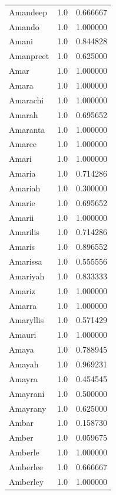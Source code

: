 \documentclass[
  letterpaper,
  DIV=11,
  numbers=noendperiod]{scrreprt}
\begin{document}
\begin{tabular}{lrr}
Amandeep        &   1.0 &   0.666667 \\
Amando          &   1.0 &   1.000000 \\
Amani           &   1.0 &   0.844828 \\
Amanpreet       &   1.0 &   0.625000 \\
Amar            &   1.0 &   1.000000 \\
Amara           &   1.0 &   1.000000 \\
Amarachi        &   1.0 &   1.000000 \\
Amarah          &   1.0 &   0.695652 \\
Amaranta        &   1.0 &   1.000000 \\
Amaree          &   1.0 &   1.000000 \\
Amari           &   1.0 &   1.000000 \\
Amaria          &   1.0 &   0.714286 \\
Amariah         &   1.0 &   0.300000 \\
Amarie          &   1.0 &   0.695652 \\
Amarii          &   1.0 &   1.000000 \\
Amarilis        &   1.0 &   0.714286 \\
Amaris          &   1.0 &   0.896552 \\
Amarissa        &   1.0 &   0.555556 \\
Amariyah        &   1.0 &   0.833333 \\
Amariz          &   1.0 &   1.000000 \\
Amarra          &   1.0 &   1.000000 \\
Amaryllis       &   1.0 &   0.571429 \\
Amauri          &   1.0 &   1.000000 \\
Amaya           &   1.0 &   0.788945 \\
Amayah          &   1.0 &   0.969231 \\
Amayra          &   1.0 &   0.454545 \\
Amayrani        &   1.0 &   0.500000 \\
Amayrany        &   1.0 &   0.625000 \\
Ambar           &   1.0 &   0.158730 \\
Amber           &   1.0 &   0.059675 \\
Amberle         &   1.0 &   1.000000 \\
Amberlee        &   1.0 &   0.666667 \\
Amberley        &   1.0 &   1.000000 \\

\end{tabular}
\end{document}
